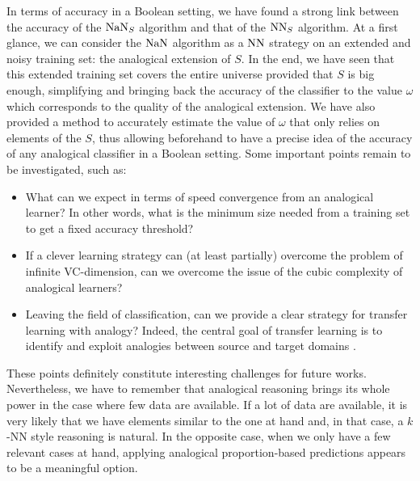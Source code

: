 In terms of accuracy in a Boolean setting, we have found a strong link between
the accuracy of the $\mbox{NaN}_S$ algorithm and that of the $\mbox{NN}_S$ algorithm. At a
first glance, we can consider the $\mbox{NaN}$ algorithm as a $\mbox{NN}$ strategy on an
extended and noisy training set: the analogical extension of $S$. In the end, we
have seen that this extended training set covers the entire universe provided
that $S$ is big enough, simplifying and bringing back the accuracy of the
classifier to the value $\omega$ which corresponds to the  quality of the
analogical extension. We have also provided a method to accurately estimate the
value of $\omega$ that only relies on elements of the $S$, thus allowing
beforehand to have a precise idea of the accuracy of any analogical classifier
in a Boolean setting. Some important points remain to be investigated, such as:
\begin{itemize}
\item What can we expect in terms of speed convergence from an analogical
  learner? In other words, what is the minimum size needed from a training set to
  get a fixed accuracy threshold?
\item If a clever learning strategy can (at least partially) overcome the
  problem of infinite VC\mbox{-}dimension, can we overcome the issue of the
  cubic complexity of analogical learners?
\item Leaving the field of classification, can we provide a clear strategy for
  transfer learning with analogy? Indeed, the central goal of transfer
    learning is to identify and exploit analogies between source and target
    domains \cite{PanYanTKDE10}.
\end{itemize}
\noindent
These points definitely constitute interesting challenges for future works.
Nevertheless, we have to remember that analogical reasoning brings its whole
power in the case where few data are available. If a lot of data are available,
it is very likely that we have elements similar to the one at hand and, in that
case, a $k$-NN style reasoning is natural. In the opposite case, when we only
have a few relevant cases at hand, applying analogical proportion-based
predictions appears to be a meaningful option.
